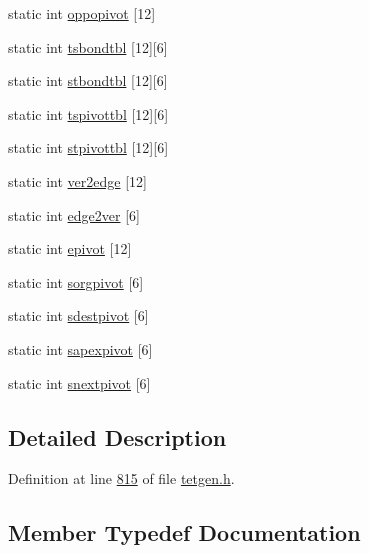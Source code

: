 \begin{DoxyCompactItemize}
\item 
static int \hyperlink{classtetgenmesh_af3192bb13349c80df3813414e0b6d47b}{oppopivot} \mbox{[}12\mbox{]}
\item 
static int \hyperlink{classtetgenmesh_a919bc3a9d61533cb229ae452c205405e}{tsbondtbl} \mbox{[}12\mbox{]}\mbox{[}6\mbox{]}
\item 
static int \hyperlink{classtetgenmesh_a15c57f6771574f4c67bfb4c29e19a7e1}{stbondtbl} \mbox{[}12\mbox{]}\mbox{[}6\mbox{]}
\item 
static int \hyperlink{classtetgenmesh_acd0ecb57a6c8ca97b3fe6bd005858c8a}{tspivottbl} \mbox{[}12\mbox{]}\mbox{[}6\mbox{]}
\item 
static int \hyperlink{classtetgenmesh_a1e8845b52a4cf0c53082dda5b3d85ab9}{stpivottbl} \mbox{[}12\mbox{]}\mbox{[}6\mbox{]}
\item 
static int \hyperlink{classtetgenmesh_a7a38e9d17ce50ec564eb72a8919b3279}{ver2edge} \mbox{[}12\mbox{]}
\item 
static int \hyperlink{classtetgenmesh_ae7eb1a5a3b3be74b4afe20fc68d9670c}{edge2ver} \mbox{[}6\mbox{]}
\item 
static int \hyperlink{classtetgenmesh_a55e3138729fb841d514bc7cc1f9e5322}{epivot} \mbox{[}12\mbox{]}
\item 
static int \hyperlink{classtetgenmesh_ad4e9c80e36d3e0520089352adb7736d8}{sorgpivot} \mbox{[}6\mbox{]}
\item 
static int \hyperlink{classtetgenmesh_a2b4f3c90f821ba68eda891d9d9a5e4bc}{sdestpivot} \mbox{[}6\mbox{]}
\item 
static int \hyperlink{classtetgenmesh_ab6ab8791bcc7357165b20796f10dd0dd}{sapexpivot} \mbox{[}6\mbox{]}
\item 
static int \hyperlink{classtetgenmesh_a4ad02da44e220a832cd15ad5ed389760}{snextpivot} \mbox{[}6\mbox{]}
\end{DoxyCompactItemize}


\subsection{Detailed Description}


Definition at line \hyperlink{tetgen_8h_source_l00815}{815} of file \hyperlink{tetgen_8h_source}{tetgen.\+h}.



\subsection{Member Typedef Documentation}
